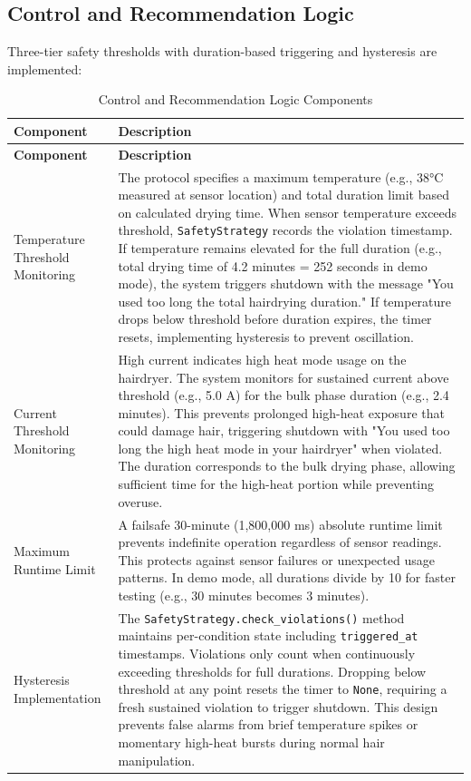 \documentclass[11pt,a4paper]{article}
\begin{document}
\subsection{Control and Recommendation Logic}

Three-tier safety thresholds with duration-based triggering and hysteresis are implemented:

\begin{longtable}{|L{0.3\textwidth}|p{0.65\textwidth}|}
\caption{Control and Recommendation Logic Components}
\label{tab:control_logic} \\
\hline
\textbf{Component} & \textbf{Description} \\
\hline
\endfirsthead
\hline
\textbf{Component} & \textbf{Description} \\
\hline
\endhead
\hline
\endfoot
\hline
\endlastfoot
Temperature Threshold Monitoring & The protocol specifies a maximum temperature (e.g., 38°C measured at sensor location) and total duration limit based on calculated drying time. When sensor temperature exceeds threshold, \texttt{SafetyStrategy} records the violation timestamp. If temperature remains elevated for the full duration (e.g., total drying time of 4.2 minutes = 252 seconds in demo mode), the system triggers shutdown with the message "You used too long the total hairdrying duration." If temperature drops below threshold before duration expires, the timer resets, implementing hysteresis to prevent oscillation. \\
\hline
Current Threshold Monitoring & High current indicates high heat mode usage on the hairdryer. The system monitors for sustained current above threshold (e.g., 5.0 A) for the bulk phase duration (e.g., 2.4 minutes). This prevents prolonged high-heat exposure that could damage hair, triggering shutdown with "You used too long the high heat mode in your hairdryer" when violated. The duration corresponds to the bulk drying phase, allowing sufficient time for the high-heat portion while preventing overuse. \\
\hline
Maximum Runtime Limit & A failsafe 30-minute (1,800,000 ms) absolute runtime limit prevents indefinite operation regardless of sensor readings. This protects against sensor failures or unexpected usage patterns. In demo mode, all durations divide by 10 for faster testing (e.g., 30 minutes becomes 3 minutes). \\
\hline
Hysteresis Implementation & The \texttt{SafetyStrategy.check\_violations()} method maintains per-condition state including \texttt{triggered\_at} timestamps. Violations only count when continuously exceeding thresholds for full durations. Dropping below threshold at any point resets the timer to \texttt{None}, requiring a fresh sustained violation to trigger shutdown. This design prevents false alarms from brief temperature spikes or momentary high-heat bursts during normal hair manipulation. \\

\end{longtable}
\end{document}
